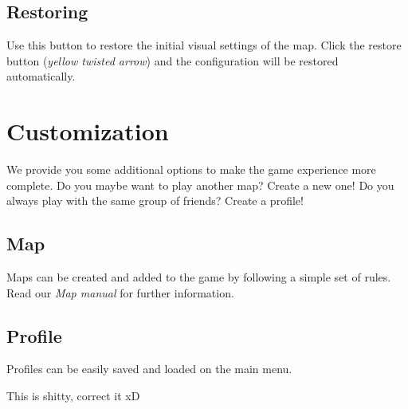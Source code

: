 \documentclass[12pt,a4paper]{article}
\begin{document}
\subsection{Restoring}
Use this button to restore the initial visual settings of the map. Click the restore button ({\it yellow twisted arrow}) and the configuration will be restored automatically.

\section{Customization}
We provide you some additional options to make the game experience more complete. Do you maybe want to play another map? Create a new one! Do you always play with the same group of friends? Create a profile!

\subsection{Map}
Maps can be created and added to the game by following a simple set of rules. Read our {\it Map manual} for further information.

\subsection{Profile}
Profiles can be easily saved and loaded on the main menu. 

\begin{todo}[Alberto]
  This is shitty, correct it xD
\end{todo}
\end{document}
